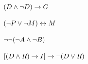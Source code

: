 \begin{compactlist}

\item	$(D \wedge \neg D) \rightarrow G $




\item	$(\neg P \vee \neg M) \leftrightarrow M $




\item	$\neg \neg (\neg A \wedge \neg B)  $




\item 	$[(D \wedge R) \rightarrow I] \rightarrow \neg(D \vee R) $


\end{compactlist}
